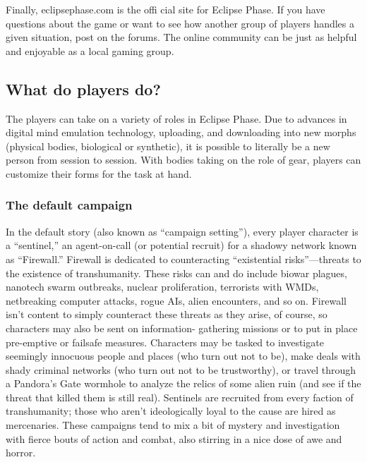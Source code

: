 Finally, eclipsephase.com is the offi cial site for Eclipse Phase. If you have questions about the game or want to see how another group of players handles a given situation, post on the forums. The online community can be just as helpful and enjoyable as a local gaming group. 



\subsection{What do players do?} \label{sec:what-do-players} 

The players can take on a variety of roles in Eclipse Phase. Due to advances in digital mind emulation technology, uploading, and downloading into new morphs (physical bodies, biological or synthetic), it is possible to literally be a new person from session to session. With bodies taking on the role of gear, players can customize their forms for the task at hand. 



\subsubsection{The default campaign} \label{sec:default-campaign} 

In the default story (also known as ``campaign setting''), every player character is a ``sentinel,'' an agent-on-call (or potential recruit) for a shadowy network known as ``Firewall.'' Firewall is dedicated to counteracting ``existential risks''—threats to the existence of transhumanity. These risks can and do include biowar plagues, nanotech swarm outbreaks, nuclear proliferation, terrorists with WMDs, netbreaking computer attacks, rogue AIs, alien encounters, and so on. Firewall isn't content to simply counteract these threats as they arise, of course, so characters may also be sent on information- gathering missions or to put in place pre-emptive or failsafe measures. Characters may be tasked to investigate seemingly innocuous people and places (who turn out not to be), make deals with shady criminal networks (who turn out not to be trustworthy), or travel through a Pandora's Gate wormhole to analyze the relics of some alien ruin (and see if the threat that killed them is still real). Sentinels are recruited from every faction of transhumanity; those who aren't ideologically loyal to the cause are hired as mercenaries. These campaigns tend to mix a bit of mystery and investigation with fierce bouts of action and combat, also stirring in a nice dose of awe and horror. 



